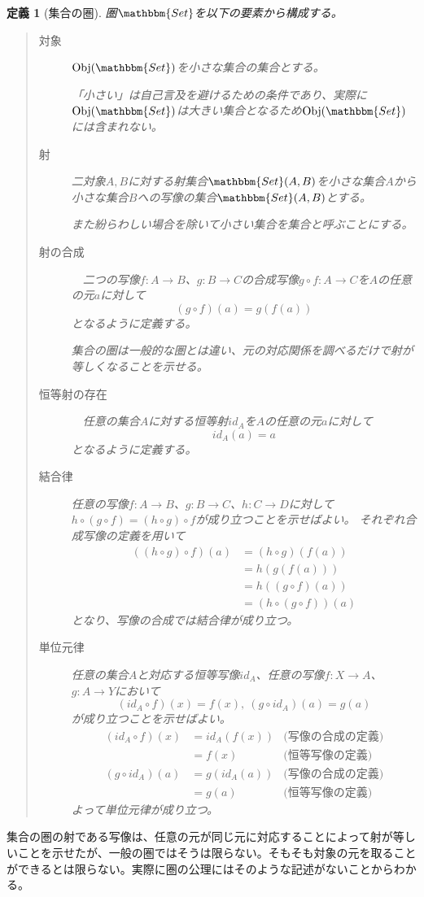 \documentclass[dvipdfmx]{jsarticle}
\newcommand{\cat}[1]{\mathbbm{#1}}
\newcommand{\arrow}{\rightarrow}
\newcommand{\obj}[1]{\mathrm{Obj}(\cat{#1})}
\newcommand{\mor}[3]{#1:#2\arrow #3}
\newcommand{\arset}[3]{\cat{#1}(#2,#3)}
\newtheorem{define}{定義}[section]
\numberwithin{proof}{subsection}
\numberwithin{prop}{subsection}
\numberwithin{define}{subsection}
\begin{document}
	\begin{define}[集合の圏]
		圏$\cat{Set}$を以下の要素から構成する。
		\begin{quote}
			\begin{description}
				\item[対象] $\obj{Set}$を小さな集合の集合とする。

				「小さい」は自己言及を避けるための条件であり、実際に$\obj{Set}$は大きい集合となるため$\obj{Set}$には含まれない。
				\item[射] 二対象$A,B$に対する射集合$\arset{Set}{A}{B}$を小さな集合$A$から小さな集合$B$への写像の集合$\arset{Set}{A}{B}$とする。

				また紛らわしい場合を除いて小さい集合を集合と呼ぶことにする。
				\item[射の合成] 　二つの写像$\mor{f}{A}{B}$、$\mor{g}{B}{C}$の合成写像$\mor{g\circ f}{A}{C}$を$A$の任意の元$a$に対して\[(g\circ f)(a)=g(f(a))\]となるように定義する。

				集合の圏は一般的な圏とは違い、元の対応関係を調べるだけで射が等しくなることを示せる。
				\item[恒等射の存在]　任意の集合$A$に対する恒等射$id_A$を$A$の任意の元$a$に対して\[id_A(a)=a\]となるように定義する。
				\item[結合律] 任意の写像$\mor{f}{A}{B}$、$\mor{g}{B}{C}$、$\mor{h}{C}{D}$に対して$h\circ(g\circ f)=(h\circ g)\circ f$が成り立つことを示せばよい。
				それぞれ合成写像の定義を用いて
				\begin{align*}
					((h\circ g)\circ f)(a)&=(h\circ g)(f(a))\\
					&=h(g(f(a)))\\
					&=h((g\circ f)(a))\\
					&=(h\circ(g\circ f))(a)
				\end{align*}
				となり、写像の合成では結合律が成り立つ。
				\item[単位元律] 任意の集合$A$と対応する恒等写像$id_A$、任意の写像$\mor{f}{X}{A}$、$\mor{g}{A}{Y}$において\[(id_A\circ f)(x)=f(x),\ (g\circ id_A)(a)=g(a)\]が成り立つことを示せばよい。
				\begin{align*}
					(id_A\circ f)(x)&=id_A(f(x))&\text{(写像の合成の定義)}\\
					&=f(x)&\text{{(恒等写像の定義)}}\\
					(g\circ id_A)(a)&=g(id_A(a))&\text{(写像の合成の定義)}\\
					&=g(a)&\text{{(恒等写像の定義)}}
				\end{align*}
				よって単位元律が成り立つ。
			\end{description}
		\end{quote}
	\end{define}
	集合の圏の射である写像は、任意の元が同じ元に対応することによって射が等しいことを示せたが、一般の圏ではそうは限らない。そもそも対象の元を取ることができるとは限らない。実際に圏の公理にはそのような記述がないことからわかる。
\end{document}
